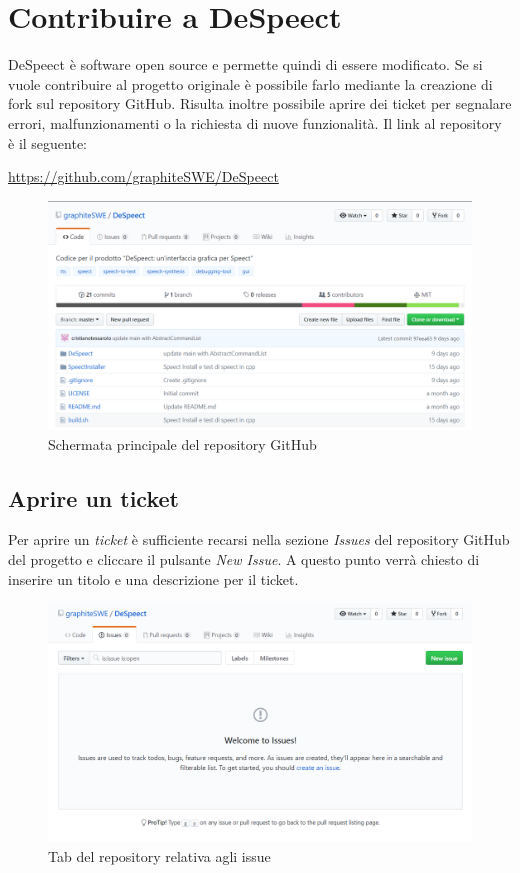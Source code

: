 \documentclass[openany,12pt,a4paper]{report}
\begin{document}
	\chapter{Contribuire a DeSpeect}
	
	DeSpeect è software open source e permette quindi di
	essere modificato. Se si vuole contribuire al progetto originale è possibile farlo mediante la creazione di fork sul repository GitHub. Risulta inoltre possibile aprire dei ticket per segnalare errori, malfunzionamenti o la richiesta di nuove funzionalità. Il link al repository è il seguente:
	\begin{center}
		\url{https://github.com/graphiteSWE/DeSpeect}
	\end{center}
	
	\begin{figure}[H]
		\includegraphics[scale=0.5]{github-home}
		\centering
		\caption{Schermata principale del repository GitHub}
	\end{figure}

	\section{Aprire un ticket}
	
	Per aprire un \textit{ticket} è sufficiente recarsi nella sezione \textit{Issues} del repository GitHub del progetto e cliccare il pulsante \textit{New Issue}. A questo punto verrà chiesto di inserire un titolo e una descrizione per il ticket.
	
	\begin{figure}[H]
		\includegraphics[scale=0.5]{github-new-issue}
		\centering
		\caption{Tab del repository relativa agli issue}
	\end{figure}
\end{document}
